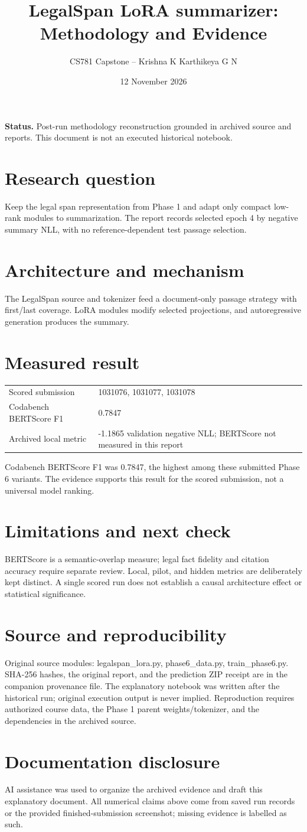 \documentclass[11pt,a4paper]{article}
\title{LegalSpan LoRA summarizer: Methodology and Evidence}
\author{CS781 Capstone -- Krishna K Karthikeya G N}
\date{12 November 2026}
\begin{document}
\maketitle
\noindent\textbf{Status.} Post-run methodology reconstruction grounded in archived source and reports. This document is not an executed historical notebook.\par
\section*{Research question}
Keep the legal span representation from Phase 1 and adapt only compact low-rank modules to summarization. The report records selected epoch 4 by negative summary NLL, with no reference-dependent test passage selection.
\section*{Architecture and mechanism}
The LegalSpan source and tokenizer feed a document-only passage strategy with first/last coverage. LoRA modules modify selected projections, and autoregressive generation produces the summary.
\section*{Measured result}
\begin{center}\begin{tabular}{ll}Scored submission & 1031076, 1031077, 1031078\\
Codabench BERTScore F1 & 0.7847\\
Archived local metric & -1.1865 validation negative NLL; BERTScore not measured in this report\end{tabular}\end{center}
Codabench BERTScore F1 was 0.7847, the highest among these submitted Phase 6 variants. The evidence supports this result for the scored submission, not a universal model ranking.
\section*{Limitations and next check}
BERTScore is a semantic-overlap measure; legal fact fidelity and citation accuracy require separate review. Local, pilot, and hidden metrics are deliberately kept distinct. A single scored run does not establish a causal architecture effect or statistical significance.
\section*{Source and reproducibility}
Original source modules: legalspan\_lora.py, phase6\_data.py, train\_phase6.py. SHA-256 hashes, the original report, and the prediction ZIP receipt are in the companion provenance file. The explanatory notebook was written after the historical run; original execution output is never implied. Reproduction requires authorized course data, the Phase 1 parent weights/tokenizer, and the dependencies in the archived source.
\section*{Documentation disclosure}
AI assistance was used to organize the archived evidence and draft this explanatory document. All numerical claims above come from saved run records or the provided finished-submission screenshot; missing evidence is labelled as such.
\end{document}

